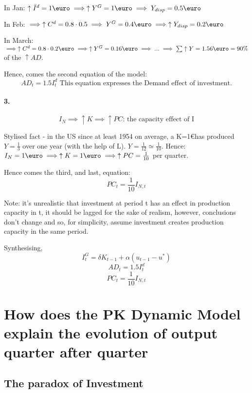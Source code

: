 \documentclass{report}
\begin{document}
In Jan: $\uparrow \bar{I}^d=1\text{\euro} \implies \uparrow Y^G=1\text{\euro} \implies Y_{disp}=0.5\text{\euro}$ 

In Feb: $\implies \uparrow C^d=0.8 \cdot 0.5 \implies Y^G=0.4\text{\euro} \implies \uparrow Y_{disp}=0.2\text{\euro}$ 

In March: $\implies \uparrow C^d=0.8\cdot 0.2 \text{\euro} \implies \uparrow Y^G=0.16\text{\euro} \implies ... \implies \sum\uparrow Y=1.56 \text{\euro}=90\%$ of the $\uparrow AD$. 

Hence, comes the second equation of the model: 
\begin{equation}
    AD_t=1.5 I^d_t \text{ This equation expresses the Demand effect of investment.}
\end{equation}

\paragraph{3.} 

\begin{equation*}
    I_N \implies \uparrow K \implies \uparrow PC \text{: the capacity effect of I}
\end{equation*}

Stylised fact - in the US since at least 1954 on average, a K=1\euro has produced $Y=\frac{1}{3}$ over one year (with the help of L). $Y=\frac{1}{12} \simeq \frac{1}{10}$. Hence: $I_N=1\text{\euro}\implies \uparrow K=1\text{\euro} \implies \uparrow PC=\frac{1}{10}$ per quarter.

Hence comes the third, and last, equation: 
\begin{equation}
    PC_t=\frac{1}{10}I_{N,t}
\end{equation}

Note: it's unrealistic that investment at period t has an effect in production capacity in t, it should be lagged for the sake of realism, however, conclusions don't change and so, for simplicity, assume investment creates production capacity in the same period. 

Synthesising, 
\[ I^G_t=\delta K_{t-1}+\alpha(u_{t-1}-u^*) \]
\[ AD_t=1.5I^d_t \]
\[ PC_t=\frac{1}{10}I_{N,t} \]

\section{How does the PK Dynamic Model explain the evolution of output quarter after quarter}

\subsection{The paradox of Investment}
\end{document}
